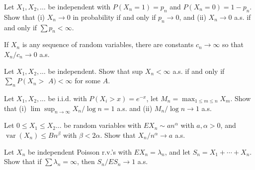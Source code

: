 \documentclass[en, normal, 11pt, black]{elegantnote}
\newenvironment{exercise}[1]{\begin{tcolorbox}[colback=black!15, colframe=black!80, breakable, title=#1]}{\end{tcolorbox}}
\begin{document}
    \begin{exercise}{2.3.11}
        Let $X_{1}, X_{2}, \ldots$ be independent with $P\left(X_{n}=1\right)=p_{n}$ and $P\left(X_{n}=0\right)=1-p_{n}$. Show that (i) $X_{n} \rightarrow 0$ in probability if and only if $p_{n} \rightarrow 0$, and (ii) $X_{n} \rightarrow 0$ a.s. if and only if $\sum p_{n}<\infty$. 
    \end{exercise}

    \begin{exercise}{2.3.13}
        If $X_{n}$ is any sequence of random variables, there are constants $c_{n} \rightarrow \infty$ so that $X_{n} / c_{n} \rightarrow 0$ a.s. 
    \end{exercise}

    \begin{exercise}{2.3.14}
        Let $X_{1}, X_{2}, \ldots$ be independent. Show that sup $X_{n}<\infty$ a.s. if and only if $\sum_{n} P\left(X_{n}>\right.$ $A)<\infty$ for some $A$. 
    \end{exercise} 
    
    \begin{exercise}{2.3.15}
        Let $X_{1}, X_{2}, \ldots$ be i.i.d. with $P\left(X_{i}>x\right)=e^{-x}$, let $M_{n}=\max _{1 \leq m \leq n} X_{m} .$ Show that (i) $\lim \sup _{n \rightarrow \infty} X_{n} / \log n=1$ a.s. and (ii) $M_{n} / \log n \rightarrow 1$ a.s. 
    \end{exercise}

    \begin{exercise}{2.3.18}
        Let $0 \leq X_{1} \leq X_{2} \ldots$ be random variables with $E X_{n} \sim a n^{\alpha}$ with $a, \alpha>0$, and $\operatorname{var}\left(X_{n}\right) \leq B n^{\beta}$ with $\beta<2 \alpha .$ Show that $X_{n} / n^{\alpha} \rightarrow a$ a.s. 
    \end{exercise}
    
    \begin{exercise}{2.3.19}
        Let $X_{n}$ be independent Poisson r.v.'s with $E X_{n}=\lambda_{n}$, and let $S_{n}=X_{1}+\cdots+X_{n}$. Show that if $\sum \lambda_{n}=\infty$, then $S_{n} / E S_{n} \rightarrow 1$ a.s. 
    \end{exercise}
\end{document}
